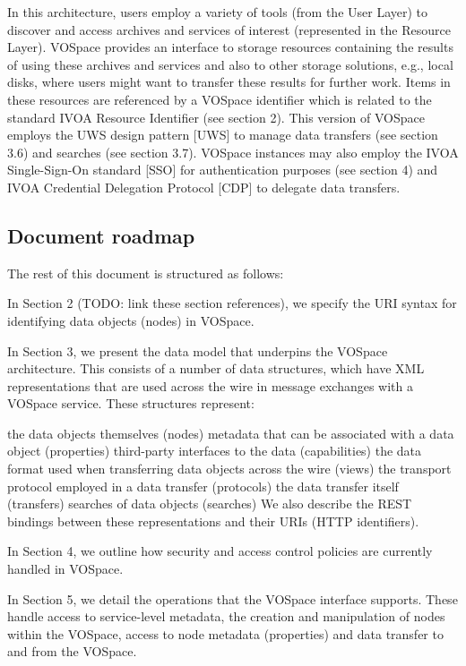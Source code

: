 \documentclass[11pt,a4paper]{ivoa}
\begin{document}
In this architecture, users employ a variety of tools (from the User Layer) to discover and access archives and services of interest (represented in the Resource Layer). VOSpace provides an interface to storage resources containing the results of using these archives and services and also to other storage solutions, e.g., local disks, where users might want to transfer these results for further work. Items in these resources are referenced by a VOSpace identifier which is related to the standard IVOA Resource Identifier (see section 2). This version of VOSpace employs the UWS design pattern [UWS] to manage data transfers (see section 3.6) and searches (see section 3.7). VOSpace instances may also employ the IVOA Single-Sign-On standard [SSO] for authentication purposes (see section 4) and IVOA Credential Delegation Protocol [CDP] to delegate data transfers.

\subsection{Document roadmap}
\label{subsec:document roadmap}
The rest of this document is structured as follows:

In Section 2 (TODO: link these section references), we specify the URI syntax for identifying data objects (nodes) in VOSpace.

In Section 3, we present the data model that underpins the VOSpace architecture. This consists of a number of data structures, which have XML representations that are used across the wire in message exchanges with a VOSpace service. These structures represent:

the data objects themselves (nodes)
metadata that can be associated with a data object (properties)
third-party interfaces to the data (capabilities)
the data format used when transferring data objects across the wire (views)
the transport protocol employed in a data transfer (protocols)
the data transfer itself (transfers)
searches of data objects (searches)
We also describe the REST bindings between these representations and their URIs (HTTP identifiers).

In Section 4, we outline how security and access control policies are currently handled in VOSpace.

In Section 5, we detail the operations that the VOSpace interface supports. These handle access to service-level metadata, the creation and manipulation of nodes within the VOSpace, access to node metadata (properties) and data transfer to and from the VOSpace.
\end{document}
